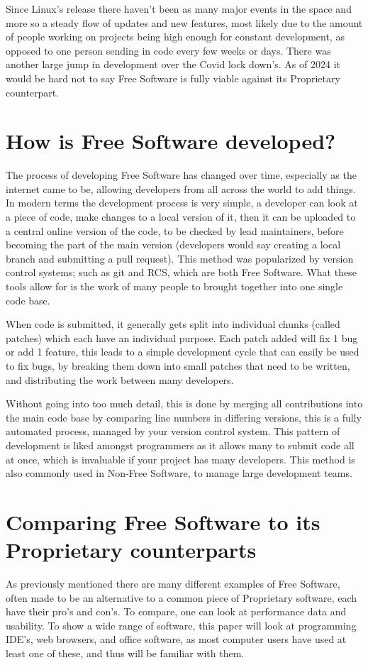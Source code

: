 \documentclass[a4paper,12pt]{article}
\begin{document}
{Since Linux's release there haven't been as many major events in the space and more so a steady flow of updates
and new features, most likely due to the amount of people working on projects being high enough for constant
development, as opposed to one person sending in code every few weeks or days.	There was another large jump
in development over the Covid lock down's. As of 2024 it would be hard not to say Free Software is fully viable
against its Proprietary counterpart.

\section{How is Free Software developed?} The process of developing Free Software has changed over time, especially
as the internet came to be, allowing developers from all across the world to add things. In modern terms the
development process is very simple, a developer can look at a piece of code, make changes to a local version of
it, then it can be uploaded to a central online version of the code, to be checked by lead maintainers, before
becoming the part of the main version (developers would say creating a local branch and submitting a pull request).
This method was popularized by version control systems; such as git\cite{GIT} and RCS, which are both Free Software.
What these tools allow for is the work of many people to brought together into one single code base.

When code is submitted, it generally gets split into individual chunks (called patches) which each have an individual
purpose. Each patch added will fix 1 bug or add 1 feature, this leads to a simple development cycle that can easily
be used to fix bugs, by breaking them down into small patches that need to be written, and distributing the work
between many developers.

Without going into too much detail, this is done by merging all contributions into the main code base by
comparing line numbers in differing versions, this is a fully automated process, managed by your version control
system. This pattern of development is liked amongst programmers as it allows many to submit code all at once,
which is invaluable if your project has many developers. This method is also commonly used in Non-Free Software,
to manage large development teams\cite{NONFREEvcs}.

\section{Comparing Free Software to its Proprietary counterparts} As previously mentioned there are many different
examples of Free Software, often made to be an alternative to a common piece of Proprietary software, each have
their pro's and con's. To compare, one can look at performance data and usability. To show a wide range of software,
this paper will look at programming IDE's, web browsers, and office software, as most computer users have used at
least one of these, and thus will be familiar with them.

}
\end{document}
